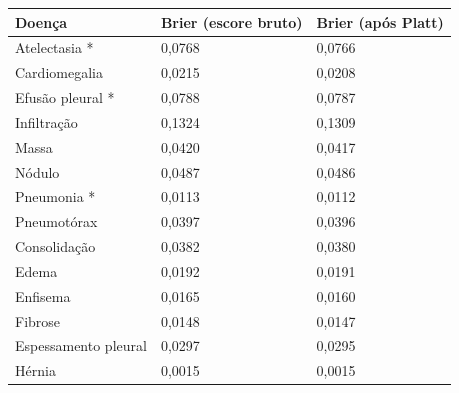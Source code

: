 \begin{tabular}{lll}
\toprule
Doença & Brier (escore bruto) & Brier (após Platt) \\
\midrule
Atelectasia * & 0,0768 & 0,0766 \\
Cardiomegalia & 0,0215 & 0,0208 \\
Efusão pleural * & 0,0788 & 0,0787 \\
Infiltração & 0,1324 & 0,1309 \\
Massa & 0,0420 & 0,0417 \\
Nódulo & 0,0487 & 0,0486 \\
Pneumonia * & 0,0113 & 0,0112 \\
Pneumotórax & 0,0397 & 0,0396 \\
Consolidação & 0,0382 & 0,0380 \\
Edema & 0,0192 & 0,0191 \\
Enfisema & 0,0165 & 0,0160 \\
Fibrose & 0,0148 & 0,0147 \\
Espessamento pleural & 0,0297 & 0,0295 \\
Hérnia & 0,0015 & 0,0015 \\
\bottomrule
\end{tabular}
